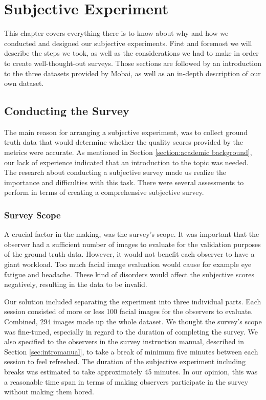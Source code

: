 \chapter{Subjective Experiment}
\label{chap:subjective}
This chapter covers everything there is to know about why and how we conducted and designed our subjective experiments. First and foremost we will describe the steps we took, as well as the considerations we had to make in order to create well-thought-out surveys. Those sections are followed by an introduction to the three datasets provided by Mobai, as well as an in-depth description of our own dataset. 

\section{Conducting the Survey}
\label{sec:ConductingSurvey}
The main reason for arranging a subjective experiment, was to collect ground truth data that would determine whether the quality scores provided by the metrics were accurate. As mentioned in Section \ref{section:academic background}, our lack of experience indicated that an introduction to the topic was needed. The research about conducting a subjective survey made us realize the importance and difficulties with this task. There were several assessments to perform in terms of creating a comprehensive subjective survey.

 
\subsection*{Survey Scope}
A crucial factor in the making, was the survey's scope. It was important that the observer had a sufficient number of images to evaluate for the validation purposes of the ground truth data. However, it would not benefit each observer to have a giant workload. Too much facial image evaluation would cause for example eye fatigue and headache. These kind of disorders would affect the subjective scores negatively, resulting in the data to be invalid. 

Our solution included separating the experiment into three individual parts. Each session consisted of more or less 100 facial images for the observers to evaluate. Combined, 294 images made up the whole dataset. We thought the survey's scope was fine-tuned, especially in regard to the duration of completing the survey. We also specified to the observers in the survey instruction manual, described in Section \ref{sec:intromanual}, to take a break of minimum five minutes between each session to feel refreshed. The duration of the subjective experiment including breaks was estimated to take approximately 45 minutes. In our opinion, this was a reasonable time span in terms of making observers participate in the survey without making them bored. 

